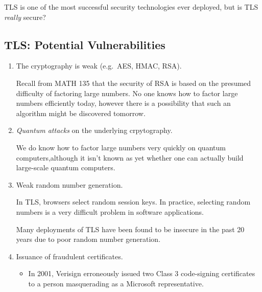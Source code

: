 TLS is one of the most successful security technologies ever deployed, but
is TLS \emph{really} secure?

\subsection*{TLS\@: Potential Vulnerabilities}

\begin{enumerate}
    \item The cryptography is weak (e.g.\ AES, HMAC, RSA).

              {\color{blue} Recall from MATH 135 that the security of
                  RSA is based on the presumed difficulty of factoring large numbers. No one
                  knows how to factor large numbers efficiently today, however there is a
                  possibility that such an algorithm might be discovered tomorrow.}
    \item \emph{Quantum attacks} on the underlying crpytography.

              {\color{blue} We do know how to factor large numbers very
                  quickly on quantum computers,although it isn't known as yet whether one
                  can actually build large-scale quantum computers.}
    \item Weak random number generation.

              {\color{blue} In TLS, browsers select random
                  session keys. In practice, selecting random numbers is a very difficult
                  problem in software applications.

                  Many deployments of TLS have been found to be insecure in the past 20 years
                  due to poor random number generation.}
    \item Issuance of fraudulent certificates.
          \begin{itemize}
              \item In 2001, Verisign erroneously issued two Class 3
                    code-signing certificates to a person masquerading as a Microsoft
                    representative.


\end{itemize}
\end{enumerate}
